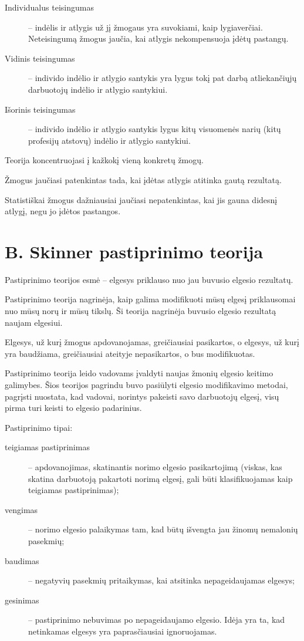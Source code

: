 \begin{description}
  \item[Individualus teisingumas] – indėlis ir atlygis už jį žmogaus
    yra suvokiami, kaip lygiaverčiai. Neteisingumą žmogus jaučia,
    kai atlygis nekompensuoja įdėtų pastangų.
  \item[Vidinis teisingumas] – individo indėlio ir atlygio santykis yra
    lygus tokį pat darbą atliekančiųjų darbuotojų indėlio ir atlygio
    santykiui.
  \item[Išorinis teisingumas] – individo indėlio ir atlygio santykis
    lygus kitų visuomenės narių (kitų profesijų atstovų) indėlio
    ir atlygio santykiui.
\end{description}

Teorija koncentruojasi į kažkokį vieną konkretų žmogų.

Žmogus jaučiasi patenkintas tada, kai įdėtas atlygis atitinka gautą
rezultatą.

Statistiškai žmogus dažniausiai jaučiasi nepatenkintas, kai jis gauna
didesnį atlygį, negu jo įdėtos pastangos.

\section{B. Skinner pastiprinimo teorija}

Pastiprinimo teorijos esmė – elgesys priklauso nuo jau buvusio elgesio
rezultatų.

Pastiprinimo teorija nagrinėja, kaip galima modifikuoti mūsų elgesį
priklausomai nuo mūsų norų ir mūsų tikslų. Ši teorija nagrinėja
buvusio elgesio rezultatą naujam elgesiui.

Elgesys, už kurį žmogus apdovanojamas, greičiausiai pasikartos, o
elgesys, už kurį yra baudžiama, greičiausiai ateityje nepasikartos,
o bus modifikuotas.

Pastiprinimo teorija leido vadovams įvaldyti naujas žmonių elgesio
keitimo galimybes. Šios teorijos pagrindu buvo pasiūlyti elgesio
modifikavimo metodai, pagrįsti nuostata, kad vadovai, norintys
pakeisti savo darbuotojų elgesį, visų pirma turi keisti to elgesio
padarinius.

Pastiprinimo tipai:
\begin{description}
  \item[teigiamas pastiprinimas] – apdovanojimas, skatinantis norimo
    elgesio pasikartojimą (viskas, kas skatina darbuotoją pakartoti norimą
    elgesį, gali būti klasifikuojamas kaip teigiamas pastiprinimas);
  \item[vengimas] – norimo elgesio palaikymas tam, kad būtų išvengta
    jau žinomų nemalonių pasekmių;
  \item[baudimas] – negatyvių pasekmių pritaikymas, kai atsitinka
    nepageidaujamas elgesys;
  \item[gesinimas] – pastiprinimo nebuvimas po nepageidaujamo elgesio.
    Idėja yra ta, kad netinkamas elgesys yra paprasčiausiai ignoruojamas.
\end{description}


